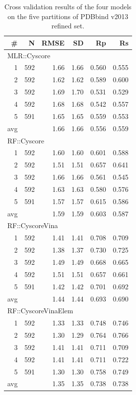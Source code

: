 \begin{table}
\caption{Cross validation results of the four models on the five partitions of PDBbind v2013 refined set.}
\label{rfcyscore:cv-stat}
\begin{tabular}{rrrrrr}
\hline
\# & N & RMSE & SD & Rp & Rs\\
\hline
\multicolumn{6}{l}{MLR::Cyscore}\\
  1 & 592 & 1.66 & 1.66 & 0.560 & 0.555\\
  2 & 592 & 1.62 & 1.62 & 0.589 & 0.600\\
  3 & 592 & 1.69 & 1.70 & 0.531 & 0.529\\
  4 & 592 & 1.68 & 1.68 & 0.542 & 0.557\\
  5 & 591 & 1.65 & 1.65 & 0.559 & 0.553\\
avg &     & 1.66 & 1.66 & 0.556 & 0.559\\
\hline
\multicolumn{6}{l}{RF::Cyscore}\\
  1 & 592 & 1.60 & 1.60 & 0.601 & 0.588\\
  2 & 592 & 1.51 & 1.51 & 0.657 & 0.641\\
  3 & 592 & 1.66 & 1.66 & 0.561 & 0.545\\
  4 & 592 & 1.63 & 1.63 & 0.580 & 0.576\\
  5 & 591 & 1.57 & 1.57 & 0.615 & 0.586\\
avg &     & 1.59 & 1.59 & 0.603 & 0.587\\
\hline
\multicolumn{6}{l}{RF::CyscoreVina}\\
  1 & 592 & 1.41 & 1.41 & 0.708 & 0.709\\
  2 & 592 & 1.38 & 1.37 & 0.730 & 0.725\\
  3 & 592 & 1.49 & 1.49 & 0.668 & 0.665\\
  4 & 592 & 1.51 & 1.51 & 0.657 & 0.661\\
  5 & 591 & 1.42 & 1.42 & 0.701 & 0.692\\
avg &     & 1.44 & 1.44 & 0.693 & 0.690\\
\hline
\multicolumn{6}{l}{RF::CyscoreVinaElem}\\
  1 & 592 & 1.33 & 1.33 & 0.748 & 0.746\\
  2 & 592 & 1.30 & 1.29 & 0.764 & 0.766\\
  3 & 592 & 1.41 & 1.41 & 0.711 & 0.709\\
  4 & 592 & 1.41 & 1.41 & 0.711 & 0.722\\
  5 & 591 & 1.30 & 1.30 & 0.758 & 0.749\\
avg &     & 1.35 & 1.35 & 0.738 & 0.738\\
\hline
\end{tabular}
\end{table}

